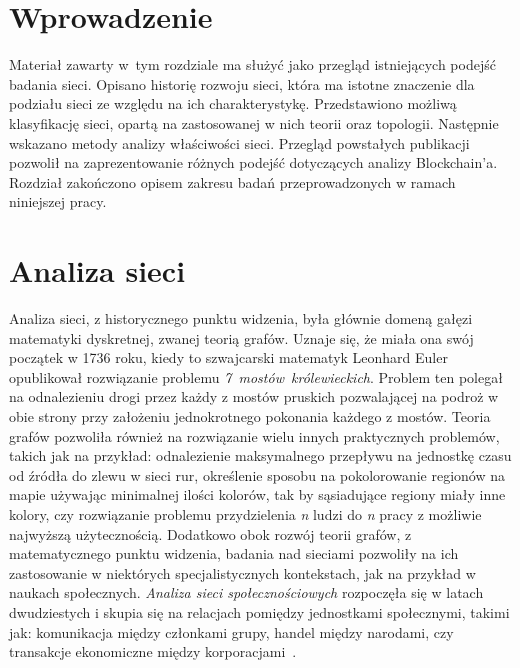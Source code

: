 \documentclass[12pt, oneside, final, openany]{mgr}
\begin{document}
\section{Wprowadzenie}

\indent Materiał zawarty w~tym rozdziale ma służyć jako przegląd istniejących podejść badania sieci. Opisano historię rozwoju sieci, która ma istotne znaczenie dla podziału sieci ze względu na ich charakterystykę. Przedstawiono możliwą klasyfikację sieci, opartą na zastosowanej w nich teorii oraz topologii. Następnie wskazano metody analizy właściwości sieci. Przegląd powstałych publikacji pozwolił na zaprezentowanie różnych podejść dotyczących analizy Blockchain'a. Rozdział zakończono opisem zakresu badań przeprowadzonych w ramach niniejszej pracy.

\section{Analiza sieci}

\indent Analiza sieci, z historycznego punktu widzenia, była głównie domeną gałęzi matematyki dyskretnej, zwanej teorią grafów. Uznaje się, że miała ona swój początek w 1736 roku, kiedy to szwajcarski matematyk Leonhard Euler opublikował rozwiązanie problemu \textit{7~mostów~królewieckich}. Problem ten polegał na odnalezieniu drogi przez każdy z mostów pruskich pozwalającej na podroż w obie strony przy założeniu jednokrotnego pokonania każdego z mostów. Teoria grafów pozwoliła również na rozwiązanie wielu innych praktycznych problemów, takich jak na przykład: odnalezienie maksymalnego przepływu na jednostkę czasu od źródła do zlewu w sieci rur, określenie sposobu na pokolorowanie regionów na mapie używając minimalnej ilości kolorów, tak by sąsiadujące regiony miały inne kolory, czy rozwiązanie problemu przydzielenia \textit{n} ludzi do \textit{n} pracy  z możliwie najwyższą użytecznością. Dodatkowo obok rozwój teorii grafów, z matematycznego punktu widzenia, badania nad sieciami pozwoliły na ich zastosowanie w niektórych specjalistycznych kontekstach, jak na przykład w naukach społecznych. \textit{Analiza sieci społecznościowych} rozpoczęła się w latach dwudziestych i skupia się na relacjach pomiędzy jednostkami społecznymi, takimi jak: komunikacja między członkami grupy, handel między narodami, czy transakcje ekonomiczne między korporacjami~\cite{BOCCALETTI2006175}.
\end{document}
